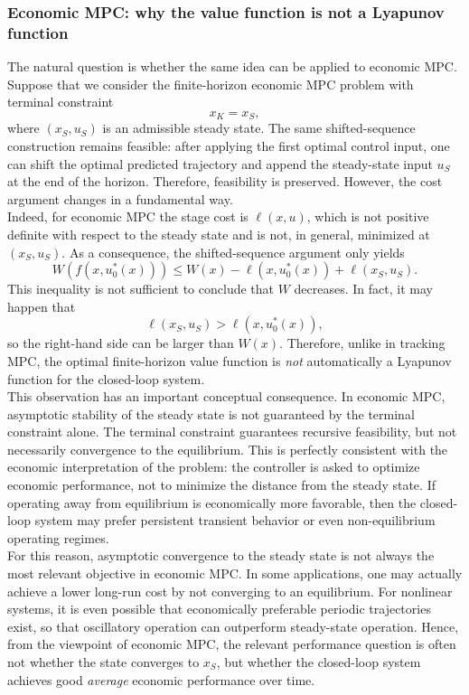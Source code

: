 \subsubsection{Economic MPC: why the value function is not a Lyapunov function}
The natural question is whether the same idea can be applied to economic MPC. Suppose that we consider the finite-horizon economic MPC problem with terminal constraint
\[
x_K = x_S,
\]
where $(x_S,u_S)$ is an admissible steady state. The same shifted-sequence construction remains feasible: after applying the first optimal control input, one can shift the optimal predicted trajectory and append the steady-state input $u_S$ at the end of the horizon. Therefore, feasibility is preserved. However, the cost argument changes in a fundamental way.\\
Indeed, for economic MPC the stage cost is $\ell(x,u)$, which is not positive definite with respect to the steady state and is not, in general, minimized at $(x_S,u_S)$. As a consequence, the shifted-sequence argument only yields
\[
W(f(x,u_0^*(x))) \leq W(x) - \ell(x,u_0^*(x)) + \ell(x_S,u_S).
\]
This inequality is not sufficient to conclude that $W$ decreases. In fact, it may happen that
\[
\ell(x_S,u_S) > \ell(x,u_0^*(x)),
\]
so the right-hand side can be larger than $W(x)$. Therefore, unlike in tracking MPC, the optimal finite-horizon value function is \emph{not} automatically a Lyapunov function for the closed-loop system.\\

This observation has an important conceptual consequence. In economic MPC, asymptotic stability of the steady state is not guaranteed by the terminal constraint alone. The terminal constraint guarantees recursive feasibility, but not necessarily convergence to the equilibrium. This is perfectly consistent with the economic interpretation of the problem: the controller is asked to optimize economic performance, not to minimize the distance from the steady state. If operating away from equilibrium is economically more favorable, then the closed-loop system may prefer persistent transient behavior or even non-equilibrium operating regimes.\\

For this reason, asymptotic convergence to the steady state is not always the most relevant objective in economic MPC. In some applications, one may actually achieve a lower long-run cost by not converging to an equilibrium. For nonlinear systems, it is even possible that economically preferable periodic trajectories exist, so that oscillatory operation can outperform steady-state operation. Hence, from the viewpoint of economic MPC, the relevant performance question is often not whether the state converges to $x_S$, but whether the closed-loop system achieves good \emph{average} economic performance over time.\\
